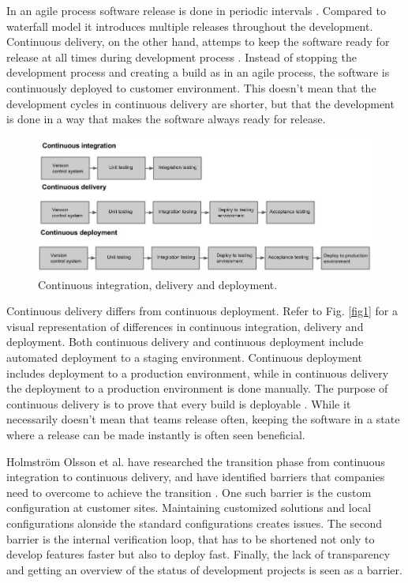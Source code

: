 \documentclass[english]{tktltiki2}
\theoremstyle{definition}
\theoremstyle{remark}
\begin{document}
In an agile process software release is done in periodic intervals \cite{cockburn2002agile}. Compared to waterfall model it introduces multiple releases throughout the development. Continuous delivery, on the other hand, attemps to keep the software ready for release at all times during development process \cite{cdbook}. Instead of stopping the development process and creating a build as in an agile process, the software is continuously deployed to customer environment. This doesn't mean that the development cycles in continuous delivery are shorter, but that the development is done in a way that makes the software always ready for release.
\begin{figure}[h]
	\centering
	\includegraphics[width=5.0in]{rtvd.jpg}
	\caption{Continuous integration, delivery and deployment.}
	\label{fig2}
\end{figure}
Continuous delivery differs from continuous deployment. Refer to Fig. \ref{fig1} for a visual representation of differences in continuous integration, delivery and deployment. Both continuous delivery and continuous deployment include automated deployment to a staging environment. Continuous deployment includes deployment to a production environment, while in continuous delivery the deployment to a production environment is done manually. The purpose of continuous delivery is to prove that every build is deployable \cite{cdbook}. While it necessarily doesn't mean that teams release often, keeping the software in a state where a release can be made instantly is often seen beneficial.

Holmström Olsson et al. have researched the transition phase from continuous integration to continuous delivery, and have identified barriers that companies need to overcome to achieve the transition \cite{olsson2012climbing}. One such barrier is the custom configuration at customer sites. Maintaining customized solutions and local configurations alonside the standard configurations creates issues. The second barrier is the internal verification loop, that has to be shortened not only to develop features faster but also to deploy fast. Finally, the lack of transparency and getting an overview of the status of development projects is seen as a barrier.
\end{document}
